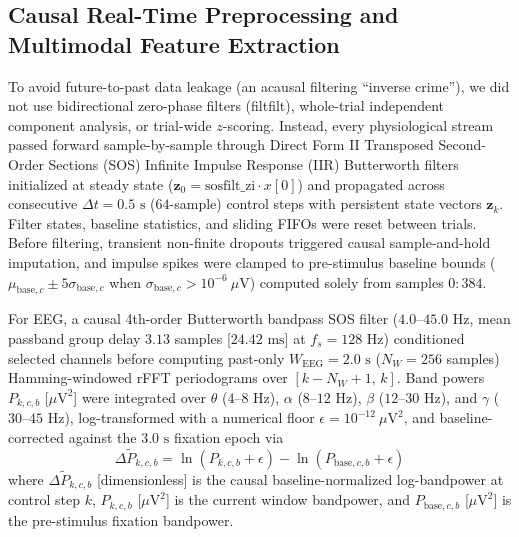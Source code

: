 \documentclass[a4paper,fleqn]{cas-dc}
\begin{document}
\subsection{Causal Real-Time Preprocessing and Multimodal Feature Extraction}\label{subsec:causal_features}

To avoid future-to-past data leakage (an acausal filtering ``inverse crime''), we did not use bidirectional zero-phase filters (filtfilt), whole-trial independent component analysis, or trial-wide $z$-scoring. Instead, every physiological stream passed forward sample-by-sample through Direct Form II Transposed Second-Order Sections (SOS) Infinite Impulse Response (IIR) Butterworth filters initialized at steady state ($\mathbf{z}_0 = \text{sosfilt\_zi} \cdot x[0]$) and propagated across consecutive $\Delta t = 0.5\text{ s}$ ($64$-sample) control steps with persistent state vectors $\mathbf{z}_k$. Filter states, baseline statistics, and sliding FIFOs were reset between trials. Before filtering, transient non-finite dropouts triggered causal sample-and-hold imputation, and impulse spikes were clamped to pre-stimulus baseline bounds ($\mu_{\text{base},c} \pm 5\sigma_{\text{base},c}$ when $\sigma_{\text{base},c} > 10^{-6}\ \mu\text{V}$) computed solely from samples $0{:}384$.

For EEG, a causal 4th-order Butterworth bandpass SOS filter ($4.0\text{--}45.0\text{ Hz}$, mean passband group delay $3.13$ samples [$24.42\text{ ms}$] at $f_s = 128\text{ Hz}$) conditioned selected channels before computing past-only $W_{\text{EEG}} = 2.0\text{ s}$ ($N_W = 256$ samples) Hamming-windowed rFFT periodograms over $[k - N_W + 1,\, k]$. Band powers $P_{k,c,b}$ [$\mu\text{V}^2$] were integrated over $\theta$ ($4\text{--}8\text{ Hz}$), $\alpha$ ($8\text{--}12\text{ Hz}$), $\beta$ ($12\text{--}30\text{ Hz}$), and $\gamma$ ($30\text{--}45\text{ Hz}$), log-transformed with a numerical floor $\epsilon = 10^{-12}\ \mu\text{V}^2$, and baseline-corrected against the $3.0\text{ s}$ fixation epoch via
\begin{equation}\label{eq:eeg_log_norm}
\Delta \tilde{P}_{k,c,b} = \ln(P_{k,c,b} + \epsilon) - \ln(P_{\text{base},c,b} + \epsilon)
\end{equation}
where $\Delta \tilde{P}_{k,c,b}$ [dimensionless] is the causal baseline-normalized log-bandpower at control step $k$, $P_{k,c,b}$ [$\mu\text{V}^2$] is the current window bandpower, and $P_{\text{base},c,b}$ [$\mu\text{V}^2$] is the pre-stimulus fixation bandpower.
\end{document}
